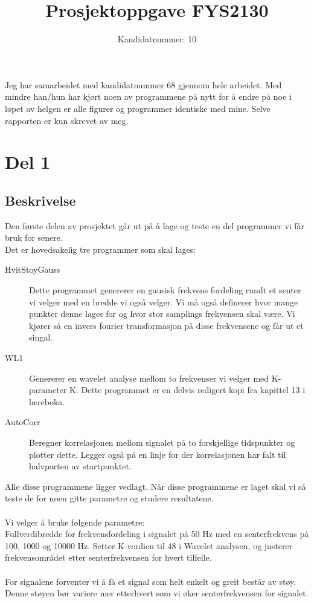 \documentclass[12pt,norsk,a4paper]{article}
\title{Prosjektoppgave FYS2130}
\author{Kandidatnummer: 10}
\date{}
\begin{document}
\maketitle
Jeg har samarbeidet med kandidatnummer 68 gjennom hele arbeidet. Med mindre han/hun har kjørt noen av programmene på nytt for å endre på noe i løpet av helgen er alle figurer og programmer identiske med mine. Selve rapporten er kun skrevet av meg.
\tableofcontents

\section{Del 1}
\subsection{Beskrivelse}
Den første delen av prosjektet går ut på å lage og teste en del programmer vi får bruk for senere. \\
Det er hovedsakelig tre programmer som skal lages:
\begin{description}
\item[HvitStoyGauss] Dette programmet genererer en gausisk frekvens fordeling rundt et senter vi velger med en bredde vi også velger. Vi må også definerer hvor mange punkter denne lages for og hvor stor samplings frekvensen skal være. Vi kjører så en invers fourier transformasjon på disse frekvensene og får ut et singal. 
\item[WL1] Genererer en wavelet analyse mellom to frekvenser vi velger med K-parameter K. 
Dette programmet er en delvis redigert kopi fra kapittel 13 i læreboka.
\item[AutoCorr] Beregner korrelasjonen mellom signalet på to forskjellige tidspunkter og plotter dette. Legger også på en linje for der korrelasjonen har falt til halvparten av startpunktet.\\
\end{description}
Alle disse programmene ligger vedlagt.
Når disse programmene er laget skal vi så teste de for noen gitte parametre og studere resultatene.\\
\\
Vi velger å bruke følgende parametre:\\
Fullverdibredde for frekvensfordeling i signalet  på 50 Hz med en senterfrekvens på 100, 1000 og 10000 Hz.
Setter K-verdien til 48 i Wavelet analysen, og justerer frekvensområdet etter senterfrekvensen for hvert tilfelle.\\
\\
For signalene forventer vi å få et signal som helt enkelt og greit består av støy. Denne støyen bør variere mer etterhvert som vi øker senterfrekvensen for signalet. \\
\end{document}
